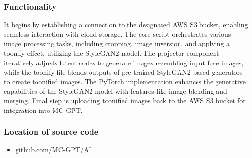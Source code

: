 \documentclass[conference]{IEEEtran}
\begin{document}
        \subsubsection{Functionality}
            It begins by establishing a connection to the designated AWS S3 bucket, enabling seamless interaction with cloud storage. The core script orchestrates various image processing tasks, including cropping, image inversion, and applying a toonify effect, utilizing the StyleGAN2 model. The projector component iteratively adjusts latent codes to generate images resembling input face images, while the toonify file blends outputs of pre-trained StyleGAN2-based generators to create toonified images. The PyTorch implementation enhances the generative capabilities of the StyleGAN2 model with features like image blending and merging. Final step is uploading toonified images back to the AWS S3 bucket for integration into MC-GPT.\\
            \vspace{3mm}
        \subsubsection{Location of source code}
            \begin{itemize}
                \item github.com/MC-GPT/AI
            \end{itemize}
\end{document}
